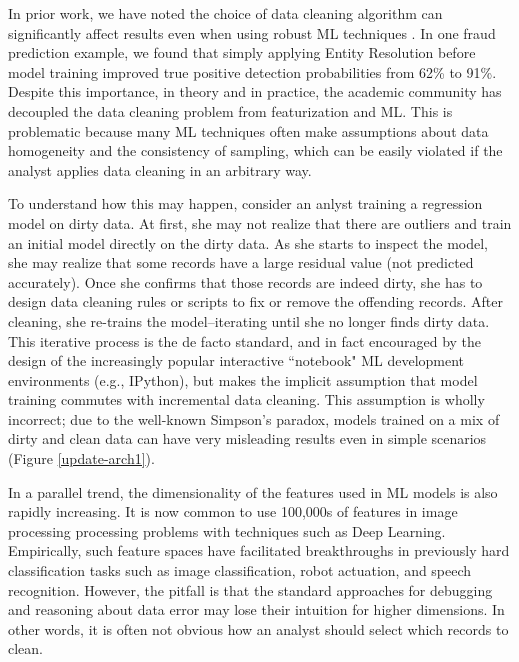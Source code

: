  In prior work, we have noted the choice of data cleaning algorithm can significantly affect results even when using robust ML techniques \cite{activecleanarxiv, DBLP:conf/case/MahlerKLSMKPWFAG14}.
 In one fraud prediction example, we found that simply applying Entity Resolution before model training improved true positive detection probabilities from 62\% to 91\%. 
Despite this importance, in theory and in practice, the academic community has decoupled the data cleaning problem from featurization and ML.
This is problematic because many ML techniques often make assumptions about data homogeneity and the consistency of sampling, which can be easily violated if the analyst applies data cleaning in an arbitrary way.

To understand how this may happen, consider an anlyst training a regression model on dirty data. At first, she may not realize that there are outliers and train an initial model directly on the dirty data. 
As she starts to inspect the model, she may realize that some records have a large residual value (not predicted accurately). 
Once she confirms that those records are indeed dirty, she has to design data cleaning rules or scripts to fix or remove the offending records. 
After cleaning, she re-trains the model--iterating until she no longer finds dirty data.
This iterative process is the de facto standard, and in fact encouraged by the design of the increasingly popular interactive ``notebook" ML development environments (e.g., IPython), but makes the implicit assumption that model training commutes with incremental data cleaning.
This assumption is wholly incorrect; due to the well-known Simpson's paradox, models trained on a mix of dirty and clean data can have very misleading results even in simple scenarios (Figure \ref{update-arch1}).

In a parallel trend, the dimensionality of the features used in ML models is also rapidly increasing. 
It is now common to use 100,000s of features in image processing processing problems with techniques such as Deep Learning.
Empirically, such feature spaces have facilitated breakthroughs in previously hard classification tasks such as image classification, robot actuation, and speech recognition.
However, the pitfall is that the standard approaches for debugging and reasoning about data error may lose their intuition for higher dimensions.
In other words, it is often not obvious how an analyst should select which records to clean.

